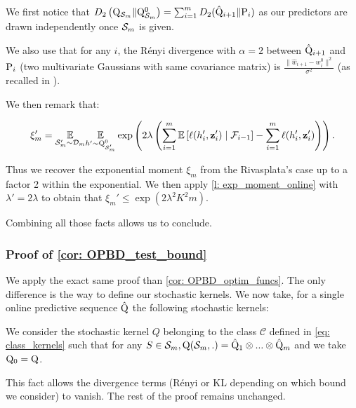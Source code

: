 We first notice that $D_{2}\left(\Q_{\Sm} \| \Q_{\Sm}^0\right) = \sum_{i=1}^m D_2(\hat{\Q}_{i+1}\| \P_{i})$ as our predictors are drawn independently once $\Sm$ is given.

We also use that for any $i$, the Rényi divergence with $\alpha=2$ between $\hat{\Q}_{i+1}$ and $\P_{i}$ (two multivariate Gaussians with same covariance matrix) is $\frac{\|\hat{w}_{i+1}- w_i^0\|^2}{\sigma^2}$ (as recalled in \cite{gil2013renyi}).

We then remark that:

\[ \xi'_m = \underset{\Sm^{\prime} \sim \Dm}{\mathbb{E}} \underset{h^{\prime} \sim \Q_{\Sm'}^0}{\mathbb{E}}
\exp\left(2\lambda \left(\sum_{i=1}^m \mathbb{E}\left[\ell(h_i',\z_i')\mid \mathcal{F}_{i-1}\right]- \sum_{i=1}^m \ell(h_i',\z_i') \right)\right).  \]

Thus we recover the exponential moment $\xi_m$ from the Rivasplata's case up to a factor 2 within the exponential. We then apply \cref{l: exp_moment_online} with $\lambda'= 2\lambda$ to obtain that $\xi_m'\leq \exp\left(  2\lambda^2K^2m \right)$.


Combining all those facts allows us to conclude.




\subsubsection{Proof of \cref{cor: OPBD_test_bound}}

We apply the exact same proof than \cref{cor: OPBD_optim_funcs}. The only difference is the way to define our stochastic kernels. We now take, for a single online predictive sequence $\hat{\Q}$ the following stochastic kernels:

We consider the stochastic kernel $Q$ belonging to the class $\mathcal{C}$ defined in \cref{eq: class_kernels} such that for any $S\in\Sm, \Q(\Sm,.) = \hat{\Q}_1\otimes ... \otimes \hat{\Q}_{m}$ and we take $\Q_0=\Q$.

This fact allows the divergence terms (Rényi or KL depending on which bound we consider) to vanish. The rest of the proof remains unchanged.

